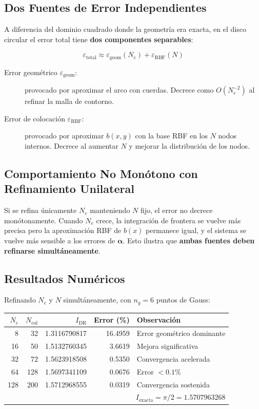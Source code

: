 \documentclass[12pt,a4paper]{article}
\begin{document}
\subsection{Dos Fuentes de Error Independientes}

A diferencia del dominio cuadrado donde la geometría era exacta, en el
disco circular el error total tiene \textbf{dos componentes separables}:

\begin{equation}
    \varepsilon_{\text{total}} \approx
    \varepsilon_{\text{geom}}(N_e) + \varepsilon_{\text{RBF}}(N)
\end{equation}

\begin{description}
    \item[Error geométrico $\varepsilon_{\text{geom}}$:] provocado por
    aproximar el arco con cuerdas. Decrece como $O(N_e^{-2})$ al refinar
    la malla de contorno.

    \item[Error de colocación $\varepsilon_{\text{RBF}}$:] provocado por
    aproximar $b(x,y)$ con la base RBF en los $N$ nodos internos. Decrece
    al aumentar $N$ y mejorar la distribución de los nodos.
\end{description}

\subsection{Comportamiento No Monótono con Refinamiento Unilateral}

Si se refina únicamente $N_e$ manteniendo $N$ fijo, el error no decrece
monótonamente. Cuando $N_e$ crece, la integración de frontera se vuelve
más precisa pero la aproximación RBF de $b(x)$ permanece igual, y el
sistema se vuelve más sensible a los errores de $\boldsymbol{\alpha}$.
Esto ilustra que \textbf{ambas fuentes deben refinarse simultáneamente}.

\subsection{Resultados Numéricos}

Refinando $N_e$ y $N$ simultáneamente, con $n_g = 6$ puntos de Gauss:

\begin{center}
\begin{tabular}{rrrrl}
\toprule
$N_e$ & $N_{\text{col}}$ & $I_{\text{DR}}$ & Error (\%) & Observación \\
\midrule
  8  &  32 & 1.3116790817 & 16.4959 & Error geométrico dominante \\
 16  &  50 & 1.5132760345 &  3.6619 & Mejora significativa \\
 32  &  72 & 1.5623918508 &  0.5350 & Convergencia acelerada \\
 64  & 128 & 1.5697341109 &  0.0676 & Error $< 0.1\%$ \\
128  & 200 & 1.5712968555 &  0.0319 & Convergencia sostenida \\
\bottomrule
\multicolumn{5}{r}{$I_{\text{exacta}} = \pi/2 = 1.5707963268$}
\end{tabular}
\end{center}
\end{document}
